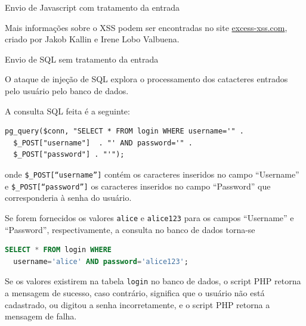 \begin{frame}{}{Envio de Javascript com tratamento da entrada}

Mais informações sobre o XSS podem ser encontradas no site
\href{http://excess-xss.com}{excess-xss.com}, criado por Jakob Kallin e Irene
Lobo Valbuena.

\end{frame}


\begin{frame}[fragile]{}{Envio de SQL sem tratamento da entrada}

O ataque de injeção de SQL explora o processamento dos catacteres entrados pelo usuário pelo 
 banco de dados.  

\pause
A consulta SQL feita é a seguinte:

{\small
\begin{verbatim}
pg_query($conn, "SELECT * FROM login WHERE username='" . 
  $_POST["username"]  . "' AND password='" . 
  $_POST["password"] . "'");
\end{verbatim}
}

onde {\tt \$\_POST[``username'']} contém os caracteres
inseridos no campo ``Username'' e {\tt \$\_POST[``password'']} os
caracteres inseridos no campo ``Password'' que corresponderia à senha
do usuário.

\end{frame}

\begin{frame}[fragile]{}

Se forem fornecidos os valores {\tt alice} e {\tt alice123} para os
campos ``Username'' e ``Password'', respectivamente, a consulta no
banco de dados torna-se

\begin{lstlisting}[language=SQL]
SELECT * FROM login WHERE 
  username='alice' AND password='alice123';
\end{lstlisting}

\end{frame}

\begin{frame}{}

  Se os valores existirem na tabela {\tt login} no banco de dados, o
script PHP retorna a mensagem de sucesso, caso contrário, significa
que o usuário não está cadastrado, ou digitou a senha incorretamente,
e o script PHP retorna a mensagem de falha.
\end{frame}

